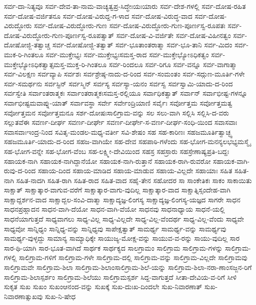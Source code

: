 {ಸರ್ವ-ದಾ-ನಿತ್ಯವೂ
ಸರ್ವ-ದೇವ-ತಾ-ನಾಮ-ವಾಚ್ಯತ್ವಪ್ರ-ಸಿದ್ಧೇಃಯಃಯಾರು
ಸರ್ವ-ದೇಶ-ಗಳಲ್ಲಿ
ಸರ್ವ-ದೋಷ-ರಹಿತ
ಸರ್ವ-ದೋಷ-ವರ್ಜಿತನೂ
ಸರ್ವ-ದೋಷ-ವಿರುದ್ದ-ಗ-ಳಾದ
ಸರ್ವ-ದೋಷ-ವಿರುದ್ಧ-ವಾದ
ಸರ್ವ-ದೋಷ-ವಿರುದ್ಧೋರು
ಸರ್ವ-ದೋಷ-ವಿರುದ್ಧೋರು-ಗುಣ
ಸರ್ವ-ದೋಷ-ವಿರುದ್ಧೋರು-ಗುಣ-ಪೂರ್ಣಸ್ವ-ರೂಪತಃ
ಸರ್ವ-ದೋಷ-ವಿರುದ್ಧೋರು-ಗುಣ-ಪೂರ್ಣಸ್ವ-ರೂಪತ್ವಾತ್
ಸರ್ವ-ದೋಷ-ವಿ-ವರ್ಜಿತೇ
ಸರ್ವ-ದೋಷ-ವಿಹೀನತ್ವಂ
ಸರ್ವ-ದೋಷೋಜ್ಜಿ-ತತ್ವಾಚ್ಚ
ಸರ್ವ-ದೋಷೋಜ್ಜಿ-ತತ್ವಾತ್
ಸರ್ವ-ಭೂತಾಂತರಾತ್ಮಾ
ಸರ್ವ-ಭೂ-ತಾನಿ
ಸರ್ವ-ಮಿದಂ
ಸರ್ವ-ಮುಕ-ರಿ-ಗಿಂತಲೂ
ಸರ್ವ-ಮುಕ್ತೇಭ್ಯಃ
ಸರ್ವ-ಮುಕ್ತೇಭ್ಯಃಸಮಸ್ತ-ರಾದ
ಸರ್ವ-ಮುಕ್ತೇಭ್ಯೋಽಧಿಕತ್ವಂ
ಸರ್ವ-ಮುಕ್ತೇಭ್ಯೋಽಧಿಕತ್ವಾತ್ಸಮಸ್ತ-ಮುಕ್ತ-ರಿ-ಗಿಂತಲೂ
ಸರ್ವ-ರಿಂದಲೂ
ಸರ್ವ-ರಿಗೂ
ಸರ್ವ-ವನ್ನೂ
ಸರ್ವ-ವಾಗಾತ್ಮಾ
ಸರ್ವ-ವಿಲಕ್ಷಣ
ಸರ್ವವ್ಯಾಪಿ
ಸರ್ವಶಃ
ಸರ್ವಶ್ರೇಷ್ಠ-ನಾದು-ದ-ರಿಂದ
ಸರ್ವ-ಸಂಮಂತಂ
ಸರ್ವ-ಸದ್ಗುಣ-ಮೂರ್ತಿ-ಗಳೇ
ಸರ್ವ-ಸಮರ್ಥನು
ಸರ್ವಸ್ಟಿನ್
ಸರ್ವಸ್ಮಿನ್
ಸರ್ವಸ್ಯ
ಸರ್ವಸ್ಯಾ-ಯನಂ
ಸರ್ವಸ್ವ
ಸರ್ವಸ್ವಾಮಿ-ಯಾದು-ದ-ರಿಂದ
ಸರ್ವಸ್ವೇತಿ
ಸರ್ವಾಂತರಾತ್ಮಕಃ
ಸರ್ವಾಂತರಾತ್ಮಕಃಸಮಸ್ತ-ರಲ್ಲಿಯೂ
ಸರ್ವಾಧಿಕತ್ವಾತ್
ಸರ್ವಾನ್
ಸರ್ವಾಭೀಷ್ಟ-ಗಳನ್ನೂ
ಸರ್ವಾಭೀಷ್ಟಮವಾಪ್ನು-ಯಾತ್
ಸರ್ವಾವಸ್ಥಾ
ಸರ್ವೇ
ಸರ್ವೇಂದ್ರಿಯಾಣಿ
ಸರ್ವೈಃ
ಸರ್ವೋತ್ತಮ
ಸರ್ವೋತ್ತಮತ್ವ
ಸರ್ವೋತ್ತಮನ
ಸರ್ವೋತ್ತಮನೂ
ಸರ್ಶ-ದೋಷಃಸಾಲಿಗ್ರಾಮ-ವನ್ನು
ಸಲ
ಸಲು-ವಾಗಿ
ಸಲ್ಲಿಸಿ
ಸಲ್ಲಿಸಿ-ದ-ವರು
ಸಲ್ಲುತವೆಈ
ಸವರ್ಣ-ದೀರ್ಘ
ಸವರ್ಣ-ದೀರ್ಘೇ
ಸವರ್ಣ-ದೀರ್ಘೇ-ಸ-ವರ್ಣ-ದೀರ್ಘ-ಸಂಧಿ-ಯಿಂದ
ಸವಾಸವಾಃ
ಸವಾಸವಾಃಇಂದ್ರ-ನಿಂದ
ಸವಿತೃ-ಮಂಡಲ-ಮಧ್ಯ-ವರ್ತೀ
ಸವಿ-ಶೇಷಂ
ಸಹ
ಸಹ-ಕಾರಿಣಃ
ಸಹಜಮೂರ್ತಿತ್ವಾಚ್ಛ್ವ
ಸಹಜಮೂರ್ತಿ-ಯಾದು-ದ-ರಿಂದ
ಸಹಜ-ವಾಗಿಯೇ
ಸಹ-ದೇವ
ಸಹಪಾಠಿ-ಗಳೆಂದು
ಸಹ-ಭೋಗ-ಮನನ್ಯಲಭಭ್ಯಮಸ್ಮೈ
ಸಹ-ಭೋಗ-ವನ್ನೇ
ಸಹ-ಭೋಗ-ವೆಂಬ
ಸಹ-ಲಕ್ಷ್ಮೀ-ದೇವಿಯಿಂದ
ಸಹಸ್ರ
ಸಹಸ್ರಾರು
ಸಹಸ್ರೇಣಾಷ್ಯಪ್ರತಿ-ಬದ್ದಃ
ಸಹಾಯಕ-ನಾಗಿ
ಸಹಾಯಕ-ನಾಗಿದ್ದಾನೆಯೋ
ಸಹಾಯಕ-ನಾಗಿ-ರುತ್ತಾನೆ
ಸಹಾಯಕ-ರಾಗಿ-ರುವರೋ
ಸಹಾಯಕ-ವಾಗಿ-ರುವು-ದ-ರಿಂದ
ಸಹಾಯ-ದಿಂದ
ಸಹಾಯ-ಮಾಡಿದ
ಸಹಾಯ-ಮಾಡುವ
ಸಹಾಯ-ವಿಲ್ಲದೇ
ಸಹಾಯಾಃ
ಸಹಿತ
ಸಹಿತ-ನಾಗಿ
ಸಹಿತ-ನಾದಗಿ
ಸಹಿತ-ರಾಗಿ
ಸಹಿತ-ರಾದ
ಸಹಿತ-ವಾದ
ಸಹೈ-ತೇನ
ಸಹೋದರ
ಸಾ
ಸಾಂಕೇತಿಕಃ
ಸಾಕಂ
ಸಾಕಾಯಿತು
ಸಾಕ್ಷಾತ್
ಸಾಕ್ಷಾತ್ಕಾರ-ವಾಗುವ-ವರೆಗೆ
ಸಾಕ್ಷಾತ್ಕಾರ-ವಾಗು-ವುದಿಲ್ಲ
ಸಾಕ್ಷಾತ್ಕಾರ-ವಾದ
ಸಾಕ್ಷಾತ್ನಿಸ್ಸಂದೇಹ-ವಾಗಿ
ಸಾಕ್ಷಾದ್ದರ್ಶನ-ವಾದ
ಸಾಕ್ಷಾದ್ಬಲ-ಸಂವಿ-ದಾತ್ಮಾ
ಸಾಕ್ಷಾದ್ಯಜ್ಞ-ಲಿಂಗಸ್ಯ
ಸಾಕ್ಷಾದ್ಯಜ್ಞ-ಲಿಂಗಸ್ಯ-ಯಜ್ಞದ
ಸಾಗರೇ
ಸಾಧನ
ಸಾಧನಪ್ರಹ್ಲಾದನ
ಸಾಧನ-ವಾಗಿ-ದೆಯೋ
ಸಾಧನ-ವಾಗಿ-ವೆಯೋ
ಸಾಧನವು
ಸಾಧನಾಧ್ಯಾಯ
ಸಾಧನೆ-ಯಲ್ಲಿ
ಸಾಧನೆಯಾಗುತ್ತದೆ
ಸಾಧ್ಯವಾಗಲು
ಸಾಧ್ಯ-ವಿಲ್ಲ
ಸಾಧ್ಯ-ವಿಲ್ಲದೇ
ಸಾಧ್ಯ-ವಿಲ್ಲ-ವೆಂದರ್ಥ
ಸಾಧ್ಯ-ವಿಲ್ಲ-ವೆಂದು
ಸಾಧ್ಯವೇ
ಸಾಧ್ಯವೋ
ಸಾನ್ನಿಧ್ಯಂ
ಸಾನ್ನಿಧ್ಯ-ವನ್ನು
ಸಾನ್ನಿಧ್ಯವು
ಸಾಪೇಕ್ಷತ್ವಾತ್
ಸಾಮರ್ಥ್ಯ
ಸಾಮರ್ಥ್ಯ-ವನ್ನು
ಸಾಮರ್ಥ್ಯವು
ಸಾಮರ್ಥ್ಯ-ವುಳ್ಳದ್ದು
ಸಾಮಾನ್ಯ
ಸಾಮ್ಯಾಧಿಕ್ಕೇ
ಸಾಯುಜ್ಯ-ಮೋಕ್ಷ-ವನ್ನು
ಸಾಯುವ-ವ-ರನ್ನು
ಸಾಯು-ವುದಿಲ್ಲ
ಸಾರ
ಸಾರ-ಥಿ-ಯಾಗಿ
ಸಾರ-ಭೂತ-ವಾಗಿದೆ
ಸಾರ್ಥಕ
ಸಾರ್ಥಕ್ಯದ
ಸಾಲಗ್ರಾಮಂ
ಸಾಲಿಗ್ರಾಮ
ಸಾಲಿಗ್ರಾಮ-ಗಳನ್ನು
ಸಾಲಿಗ್ರಾಮ-ಗಳಲ್ಲಿ
ಸಾಲಿಗ್ರಾಮ-ಗಳಿಗೆ
ಸಾಲಿಗ್ರಾಮ-ಗಳೇ
ಸಾಲಿಗ್ರಾಮ-ದಲ್ಲಿ
ಸಾಲಿಗ್ರಾಮ-ವನ್ನು
ಸಾಲಿಗ್ರಾಮ-ವಿಲ್ಲದೇ
ಸಾಲಿಗ್ರಾಮವು
ಸಾಲಿಗ್ರಾಮವೇ
ಸಾಲಿಗ್ರಾಮ-ಶಿಲಾ
ಸಾಲಿಗ್ರಾಮ-ಶಿಲಾಂಸಾಲಿಗ್ರಾಮ-ಶಿಲೆ-ಯನ್ನು
ಸಾಲಿಗ್ರಾಮ-ಶಿಲಾ-ನರಾ-ಣಾಂಸಜ್ಜನ-ರಿಗೆ
ಸಾಲಿಗ್ರಾಮ-ಶಿಲಾಸ್ಪರ್ಶಂ
ಸಾಲಿಗ್ರಾಮ-ಶಿಲೆಯು
ಸಾಲಿಗ್ರಾಮಸ್ಪರ್ಶ
ಸಿದ್ದ-ವಾಗುತ್ತದೆ
ಸೀತಾ-ದೇವಿಯ-ವ-ರಿಗೆ
ಸೀಳಿ
ಸುಕೃತ
ಸುಖ
ಸುಖಂ
ಸುಖಂಆನಂದ-ವನ್ನು
ಸುಖಕ್ಕೆ
ಸುಖ-ದುಃಖ-ದಿಂದಲೇ
ಸುಖ-ನಿವಾರಣಾತ್
ಸುಖ-ನಿವಾರಣಾತ್ಸುಖವು
ಸುಖ-ನಿ-ಷೇಧ
}
